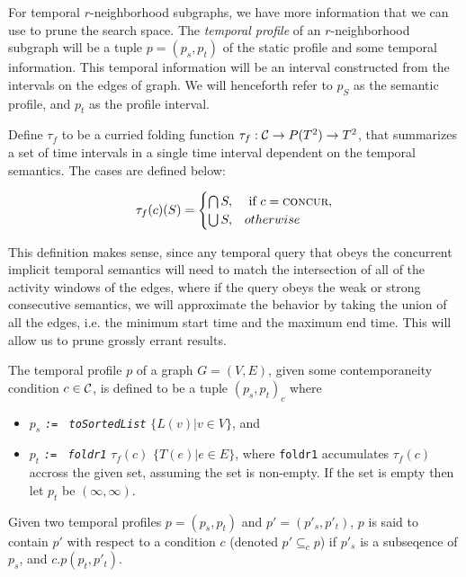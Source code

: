 For temporal $r$-neighborhood subgraphs, we have more information that we can
use to prune the search space. The \textit{temporal profile} of an
$r$-neighborhood subgraph will be a tuple $p = (p_s,p_t)$ of the static profile and
some temporal information. This temporal information will be an interval
constructed from the intervals on the edges of graph. We will henceforth refer
to $p_S$ as the semantic profile, and $p_t$ as the profile interval.

\begin{defn}
  Define $\tau_f$ to be a curried folding function $\tau_f : \mathcal{C} \to P(T^2) \to T^2$,
  that summarizes a set of time intervals in a single time interval dependent on
  the temporal semantics. The cases are defined below:

  \[
    \tau_f(c)(S) = \begin{cases}
      \bigcap S, & \text{ if } c = \textsc{concur}, \\
      \bigcup S, & otherwise      
    \end{cases}
  \]
  
\end{defn}

This definition makes sense, since any temporal query that obeys the
concurrent implicit temporal semantics will need to match the intersection of
all of the activity windows of the edges, where if the query obeys the weak or
strong consecutive semantics, we will approximate the behavior by taking the
union of all the edges, i.e. the minimum start time and the maximum end
time. This will allow us to prune grossly errant results.

\begin{defn}
  The temporal profile $p$ of a graph $G = (V,E)$, given some contemporaneity condition
  $c \in \mathcal{C}$, is defined to be a tuple $(p_s, p_t)_c$ where
  \begin{itemize}
  \item $p_s$ \emph{\texttt{:=} \, \texttt{toSortedList}} \; $\{L(v) | v \in V \}$,
    and
  \item $p_t$ \emph{\texttt{:=} \, \texttt{foldr1}} \; $\tau_f(c)$ \; $\{T(e) | e \in E\}$, where
    \texttt{foldr1} accumulates $\tau_f(c)$ accross the  given set, assuming the set
    is non-empty. If the set is empty then let $p_t$ be $(\infty,\infty)$.
  \end{itemize}

  Given two temporal profiles $p = (p_s, p_t)$ and $p' = (p'_s, p'_t)$, $p$ is
  said to contain $p'$ with respect to a condition $c$ (denoted $p' \subseteq_c
  p$) if $p'_s$ is a subseqence of $p_s$, and $c.p(p_t, p'_t)$.
\end{defn}

